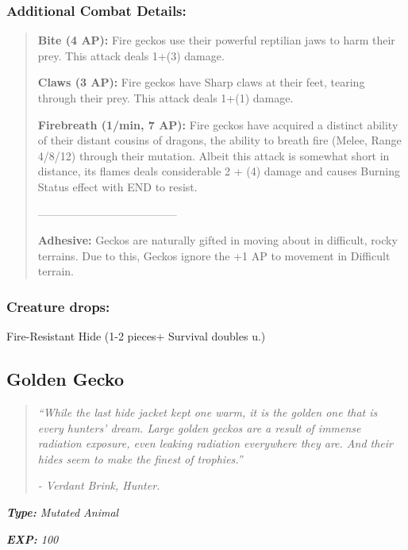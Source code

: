\documentclass[11pt,a4paper,twocolumn]{book}
\begin{document}
	\subsubsection*{Additional Combat Details:}
	\begin{verse}
		\textbf{Bite (4 AP):} Fire geckos use their powerful reptilian jaws to harm their prey. This attack deals 1+(3) damage.
		
		\textbf{Claws (3 AP):} Fire geckos have Sharp claws at their feet, tearing through their prey. This attack deals 1+(1) damage.  
		
		\textbf{Firebreath (1/min, 7 AP):} Fire geckos have acquired a distinct ability of their distant cousins of dragons, the ability to breath fire (Melee, Range 4/8/12) through their mutation. Albeit this attack is somewhat short in distance, its flames deals considerable 2 + (4) damage and causes Burning Status effect with END to resist.
		
		--------------------------------------
		
		\textbf{Adhesive:} Geckos are naturally gifted in moving about in difficult, rocky terrains. Due to this, Geckos ignore the +1 AP to movement in Difficult terrain.

	\end{verse}
	
	\subsubsection*{Creature drops:}
	Fire-Resistant Hide (1-2 pieces+ Survival doubles u.)
	
	\vfill	
	\subsection*{Golden Gecko}
	\begin{quote}
		\emph{``While the last hide jacket kept one warm, it is the golden one that is every hunters' dream. Large golden geckos are a result of immense radiation exposure, even leaking radiation everywhere they are. And their hides seem to make the finest of trophies.''}
		
		\emph{- Verdant Brink, Hunter.}
	\end{quote}
	
	\emph{\textbf{Type:} Mutated Animal}
	
	\emph{\textbf{EXP:} 100}
	
\end{document}

